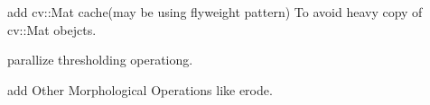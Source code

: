 
\begin{DoxyRefList}
\item[\label{todo__todo000001}%
\Hypertarget{todo__todo000001}%
Class \hyperlink{class_image_processor_1_1_abstract_image_processor}{Image\+Processor\+:\+:Abstract\+Image\+Processor} ]add cv\+::\+Mat cache(may be using flyweight pattern) To avoid heavy copy of cv\+::\+Mat obejcts.  
\item[\label{todo__todo000002}%
\Hypertarget{todo__todo000002}%
Member \hyperlink{class_image_processor_1_1_detect_color_a2097eb7955a1f87fa5aa21944197fa17}{Image\+Processor\+:\+:Detect\+Color\+:\+:detect\+Color} ()]parallize thresholding operationg.  
\item[\label{todo__todo000003}%
\Hypertarget{todo__todo000003}%
Class \hyperlink{class_image_processor_1_1_dilate}{Image\+Processor\+:\+:Dilate} ]add Other Morphological Operations like erode. 
\end{DoxyRefList}